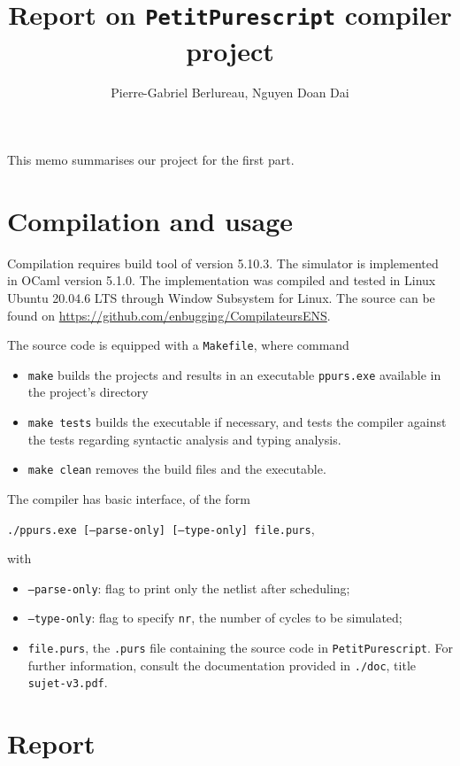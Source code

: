 \documentclass{amsart}
\title{Report on \texttt{PetitPurescript} compiler project}
\author{Pierre-Gabriel Berlureau, Nguyen Doan Dai}
\begin{document}
	\maketitle
	
	This memo summarises our project for the first part.
	
	\section{Compilation and usage}
	Compilation requires build tool  of version 5.10.3. The simulator is implemented in OCaml version 5.1.0. The implementation was compiled and tested in Linux Ubuntu 20.04.6 LTS through Window Subsystem for Linux. The source can be found on \url{https://github.com/enbugging/CompilateursENS}.
	
	The source code is equipped with a \texttt{Makefile}, where command
	\begin{itemize}
		\item \texttt{make} builds the projects and results in an executable \texttt{ppurs.exe} available in the project's directory
		\item \texttt{make tests} builds the executable if necessary, and tests the compiler against the tests regarding syntactic analysis and typing analysis.
		\item \texttt{make clean} removes the build files and the executable.
	\end{itemize}
	
	The compiler has basic interface, of the form 
	
	\texttt{./ppurs.exe [--parse-only] [--type-only] file.purs}, 
	
	with
	\begin{itemize}
		\item \texttt{--parse-only}: flag to print only the netlist after scheduling;
		\item \texttt{--type-only}: flag to specify \texttt{nr}, the number of cycles to be simulated;
		\item \texttt{file.purs}, the \texttt{.purs} file containing the source code in \texttt{PetitPurescript}. For further information, consult the documentation provided in \texttt{./doc}, title \texttt{sujet-v3.pdf}.
	\end{itemize}
	
	\section{Report}
	
\end{document}
